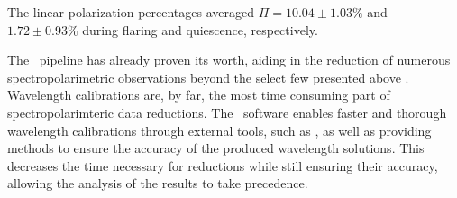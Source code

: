 The linear polarization percentages averaged $\Pi = 10.04 \pm 1.03\%$ and $1.72 \pm 0.93\%$ during flaring and quiescence, respectively.

\pagebreak

The \stops\ pipeline has already proven its worth, aiding in the reduction of numerous spectropolarimetric observations beyond the select few presented above \citep[see e.g.,][]{Barnard_2024}.
Wavelength calibrations are, by far, the most time consuming part of spectropolarimteric data reductions.
The \stops\ software enables faster and thorough wavelength calibrations through external tools, such as \iraf, as well as providing methods to ensure the accuracy of the produced wavelength solutions.
This decreases the time necessary for reductions while still ensuring their accuracy, allowing the analysis of the results to take precedence.
